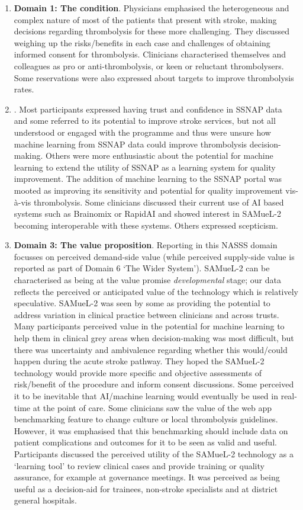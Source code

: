 \begin{enumerate}
    \item \textbf{Domain 1: The condition}. Physicians emphasised the heterogeneous and complex nature of most of the patients that present with stroke, making decisions regarding thrombolysis for these more challenging. They discussed weighing up the risks/benefits in each case and challenges of obtaining informed consent for thrombolysis. Clinicians characterised themselves and colleagues as pro or anti-thrombolysis, or keen or reluctant thrombolysers. Some reservations were also expressed about targets to improve thrombolysis rates.
    \item {}. Most participants expressed having trust and confidence in SSNAP data and some referred to its potential to improve stroke services, but not all understood or engaged with the programme and thus were unsure how machine learning from SSNAP data could improve thrombolysis decision-making. Others were more enthusiastic about the potential for machine learning to extend the utility of SSNAP as a learning system for quality improvement. The addition of machine learning to the SSNAP portal was mooted as improving its sensitivity and potential for quality improvement vis-à-vis thrombolysis. Some clinicians discussed their current use of AI based systems such as Brainomix or RapidAI and showed interest in SAMueL-2 becoming interoperable with these systems. Others expressed scepticism.
    \item \textbf{Domain 3: The value proposition}. Reporting in this NASSS domain focusses on perceived demand-side value (while perceived supply-side value is reported as part of Domain 6 ‘The Wider System’). SAMueL-2 can be characterised as being at the value promise \textit{developmental} stage; our data reflects the perceived or anticipated value of the technology which is relatively speculative. SAMueL-2 was seen by some as providing the potential to address variation in clinical practice between clinicians and across trusts. Many participants perceived value in the potential for machine learning to help them in clinical grey areas when decision-making was most difficult, but there was uncertainty and ambivalence regarding whether this would/could happen during the acute stroke pathway. They hoped the SAMueL-2 technology would provide more specific and objective assessments of risk/benefit of the procedure and inform consent discussions. Some perceived it to be inevitable that AI/machine learning would eventually be used in real-time at the point of care. Some clinicians saw the value of the web app benchmarking feature to change culture or local thrombolysis guidelines. However, it was emphasised that this benchmarking should include data on patient complications and outcomes for it to be seen as valid and useful. Participants discussed the perceived utility of the SAMueL-2 technology as a ‘learning tool’ to review clinical cases and provide training or quality assurance, for example at governance meetings. It was perceived as being useful as a decision-aid for trainees, non-stroke specialists and at district general hospitals.

\end{enumerate}

